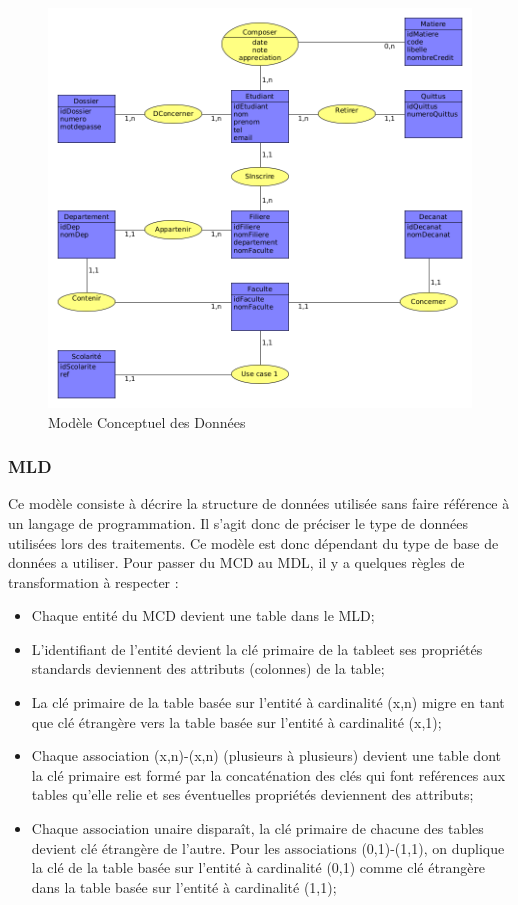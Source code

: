 \documentclass[12pt,a4paper]{article}
\begin{document}
	\begin{figure}[H]
		\centering
		\includegraphics[width=\textwidth]{mcd}
		\caption{Modèle Conceptuel des Données}
		\label{fig:figure6}
	\end{figure}

	\subsubsection{MLD}
	Ce modèle consiste à décrire la structure de données utilisée sans faire référence à un langage de programmation. Il s'agit donc de préciser le type de données utilisées lors des traitements. Ce modèle est donc dépendant du type de base de données a utiliser.
	Pour passer du MCD au MDL, il y a quelques règles de transformation à respecter :
	\begin{itemize}
		\item Chaque entité du MCD devient une table dans le MLD;
		\item L'identifiant de l'entité devient la clé primaire de la tableet ses propriétés standards deviennent des attributs (colonnes) de la table;
		\item La clé primaire de la table basée sur l'entité à cardinalité (x,n) migre en tant que clé étrangère vers la table basée sur l'entité à cardinalité (x,1);
		\item Chaque association (x,n)-(x,n) (plusieurs à plusieurs) devient une table dont la clé primaire est formé par la concaténation des clés qui font reférences aux tables qu'elle relie et ses éventuelles propriétés deviennent des attributs;
		\item Chaque association unaire disparaît, la clé primaire de chacune des tables devient clé étrangère de l'autre. Pour les associations (0,1)-(1,1), on duplique la clé de la table basée sur l'entité à cardinalité (0,1) comme clé étrangère dans la table basée sur l'entité à cardinalité (1,1);
	\end{itemize}
\end{document}
